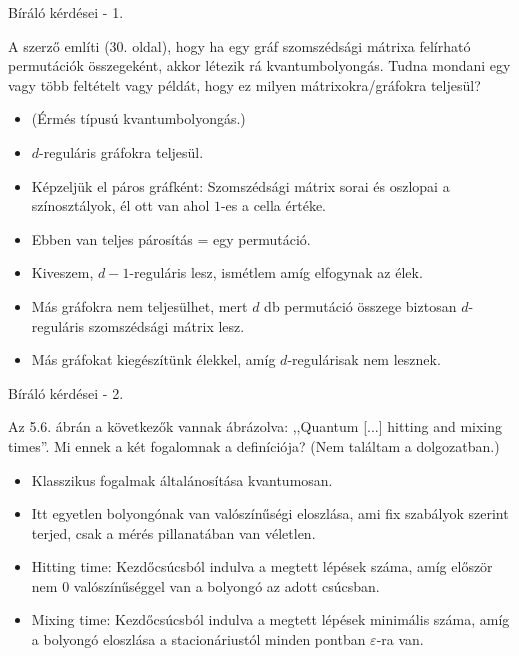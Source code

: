 \documentclass[aspectratio=169]{beamer}
\begin{document}
\begin{frame}{Bíráló kérdései - 1.}

A szerző említi (30. oldal), hogy ha egy gráf szomszédsági mátrixa felírható permutációk összegeként, akkor létezik rá kvantumbolyongás. Tudna mondani egy vagy több feltételt vagy példát, hogy ez milyen mátrixokra/gráfokra teljesül?

\begin{itemize}
  \item (Érmés típusú kvantumbolyongás.)
  \item $d$-reguláris gráfokra teljesül.
  \item Képzeljük el páros gráfként: Szomszédsági mátrix sorai és oszlopai a színosztályok, él ott van ahol $1$-es a cella értéke.
  \item Ebben van teljes párosítás = egy permutáció.
  \item Kiveszem, $d-1$-reguláris lesz, ismétlem amíg elfogynak az élek.
  \item Más gráfokra nem teljesülhet, mert $d$ db permutáció összege biztosan $d$-reguláris szomszédsági mátrix lesz.
  \item Más gráfokat kiegészítünk élekkel, amíg $d$-regulárisak nem lesznek.
\end{itemize}

\end{frame}

\begin{frame}{Bíráló kérdései - 2.}

Az 5.6. ábrán a következők vannak ábrázolva: ,,Quantum [...] hitting and mixing times''. Mi ennek a két fogalomnak a definíciója? (Nem találtam a dolgozatban.)

\begin{itemize}
  \item Klasszikus fogalmak általánosítása kvantumosan.
  \item Itt egyetlen bolyongónak van valószínűségi eloszlása, ami fix szabályok szerint terjed, csak a mérés pillanatában van véletlen.
  \item Hitting time: Kezdőcsúcsból indulva a megtett lépések száma, amíg először nem $0$ valószínűséggel van a bolyongó az adott csúcsban.
  \item Mixing time: Kezdőcsúcsból indulva a megtett lépések minimális száma, amíg a bolyongó eloszlása a stacionáriustól minden pontban $\varepsilon$-ra van.
\end{itemize}

\end{frame}
\end{document}
